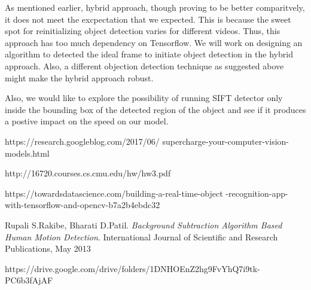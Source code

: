 \documentclass[10pt,twocolumn,letterpaper]{article}
\begin{document}
As mentioned earlier, hybrid approach, though proving to be better comparitvely, it does not meet the excpectation that we expected. This is because the sweet spot for reinitializing object detection varies for different videos. Thus, this approach has too much dependency on Tensorflow. We will work on designing an algorithm to detected the ideal frame to initiate object detection in the hybrid approach. Also, a different objection detection technique as suggested above might make the hybrid approach robust.

Also, we would like to explore the possibility of running SIFT detector only inside the bounding box of the detected region of the object and see if it produces a postive impact on the speed on our model.



\begin{thebibliography}{9}
https://research.googleblog.com/2017/06/
supercharge-your-computer-vision-models.html
 
http://16720.courses.cs.cmu.edu/hw/hw3.pdf
 
https://towardsdatascience.com/building-a-real-time-object
-recognition-app-with-tensorflow-and-opencv-b7a2b4ebdc32

Rupali S.Rakibe, Bharati D.Patil.
\textit{Background Subtraction Algorithm Based Human Motion Detection}. 
International Journal of Scientific and Research Publications, May 2013

https://drive.google.com/drive/folders/1DNHOEnZ2hg9FvYhQ7i9tk-PC6b3fAjAF

\end{thebibliography}





\


{\small


}
\end{document}
